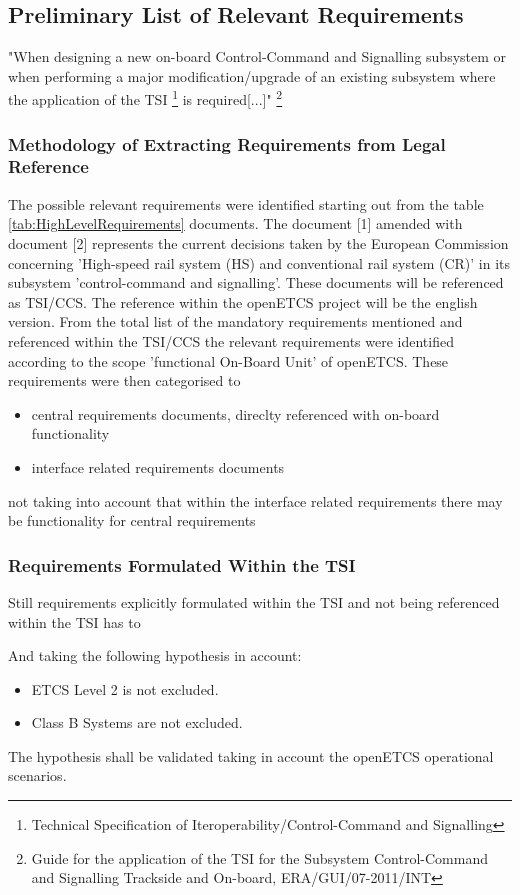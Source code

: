 \subsection{Preliminary List of Relevant Requirements}
"When designing a new on-board Control-Command and Signalling subsystem or when performing a major modification/upgrade of an existing subsystem where the application of the TSI \footnote{Technical Specification of Iteroperability/Control-Command and Signalling} is required[...]" \footnote{Guide for the application of the TSI for the Subsystem Control-Command and Signalling Trackside and On-board, ERA/GUI/07-2011/INT}

\subsubsection{Methodology of Extracting Requirements from Legal Reference}
The possible relevant requirements were identified starting out from the table \ref{tab:HighLevelRequirements} documents. 
The document [1] amended with document [2] represents the current decisions taken by the European Commission concerning 'High-speed rail system (HS) and conventional rail system (CR)' in its subsystem 'control-command and signalling'.
These documents will be referenced as TSI/CCS. 
The reference within the openETCS project will be the english version. 
From the total list of the mandatory requirements mentioned and referenced within the TSI/CCS the relevant requirements were identified  according to the scope 'functional On-Board Unit' of openETCS.
These requirements were then categorised to 
\begin{itemize}
\item central requirements documents, direclty referenced with on-board functionality
\item interface related requirements documents
\end{itemize}  
not taking into account that within the interface related requirements there may be functionality for central requirements   

\subsubsection{Requirements Formulated Within the TSI}
Still requirements explicitly formulated within the TSI and not being referenced within the TSI has to 

And taking the following hypothesis in account:
\begin{itemize} 
	\item ETCS Level 2 is not excluded.
	\item Class B Systems are not excluded.
\end{itemize}
The hypothesis shall be validated taking in account the openETCS operational scenarios.


